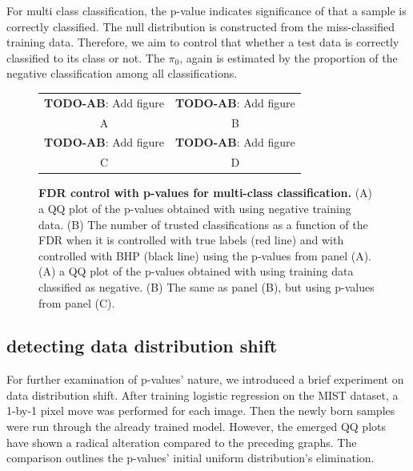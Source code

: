 \documentclass{article}
\newcommand{\todo}[2]{{\color{red} {\bf TODO-#1}: #2}}
\begin{document}
For multi class classification, the p-value indicates significance of that a sample is correctly classified. The null distribution is constructed from the miss-classified training data. Therefore, we aim to control that whether a test data is correctly classified to its class or not. The $\pi_0$, again is estimated by the proportion of the negative classification among all classifications.



\begin{figure}
	\centering
	\begin{tabular}{cc}
		\todo{AB}{Add figure} &
		\todo{AB}{Add figure} \\
		A & B \\
		\todo{AB}{Add figure} &
		\todo{AB}{Add figure} \\
		C & D \\
	\end{tabular}
	\caption{{\bf FDR control with p-values for multi-class classification.}
		(A) a QQ plot of the p-values obtained with using negative training data. (B) The number of trusted classifications as a function of the FDR when it is controlled with true labels (red line) and with controlled with BHP (black line) using the p-values from panel (A).
		(A) a QQ plot of the p-values obtained with using training data classified as negative. (B) The same as panel (B), but using p-values from panel (C).
	}
	\label{fig:examples}
\end{figure}


\subsection{detecting data distribution shift}

For further examination of p-values’ nature, we introduced a brief experiment on data distribution shift. After training logistic regression on the MIST dataset, a 1-by-1 pixel move was performed for each image. Then the newly born samples were run through the already trained model. However, the emerged QQ plots have shown a radical alteration compared to the preceding graphs. The comparison outlines the p-values’ initial uniform distribution’s elimination. 
\end{document}
